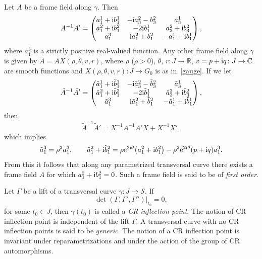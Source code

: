 \documentclass[pdftex]{sigma}
\numberwithin{equation}{section}
\def\S{\mathcal{S}}
\def\S{\mathcal{S}}
\begin{document}
Let $A$ be a frame field along $\gamma$. Then
\[
A^{-1}A'=
\begin{pmatrix}
a_1^1 +{\rm i} b_1^1 & -{\rm i} a_3^2 - b_3^2 & a_3^1\\
a_1^2 +{\rm i} b_1^2 &-2{\rm i} b_1^1 & a_3^2 +{\rm i}b_3^2 \\
 a_1^3 &{\rm i} a_1^2 + b_1^2& -a_1^1 +{\rm i} b_1^1
 \end{pmatrix},
\]
where $a_1^3$ is a strictly positive real-valued function. Any other frame field along $\gamma$
is given by $\tilde A = AX(\rho,\theta,v,r)$, where
$\rho$ ($\rho>0$), $\theta$, $r \colon J \to \mathbb R$, $v=p+{\rm i}q \colon J\to \mathbb C$ are smooth functions
and $X(\rho,\theta,v,r)\colon J \to {G}_0$ is as in~\eqref{gauge}.
%
If we let
\[
\tilde A^{-1}\tilde A'=
\begin{pmatrix}
\tilde a_1^1 +{\rm i} \tilde b_1^1 & -{\rm i} \tilde a_3^2 - \tilde b_3^2 & \tilde a_3^1\\
\tilde a_1^2 +{\rm i} \tilde b_1^2 &-2{\rm i} \tilde b_1^1 & \tilde a_3^2 +{\rm i} \tilde b_3^2 \\
\tilde a_1^3 &{\rm i} \tilde a_1^2 + \tilde b_1^2& -\tilde a_1^1 +{\rm i} \tilde b_1^1
\end{pmatrix},
\]
then
\begin{equation*}%
\tilde A^{-1}\tilde A'= X^{ -1}A^{-1} A'X + X^{ -1}X',
\end{equation*}
which implies
\[
 \tilde a_1^3= \rho^2 a_1^3,\qquad
 \tilde a_1^2 +{\rm i} \tilde b_1^2 = \rho {\rm e}^{3{\rm i}\theta} \big(a_1^2 +{\rm i} b_1^2 \big) - \rho^2 {\rm e}^{2{\rm i}\theta} (p+{\rm i}q) a_1^3.
 \]
%
From this it follows
that along any parametrized transversal curve there exists
a frame field $A$ for which $a_1^2 +{\rm i} b_1^2=0$.
Such a frame field
is said to be of \textit{first order}.
%
\begin{Definition}
Let $\Gamma$ be a lift of a transversal curve $\gamma\colon J \to \S$.
If
\[
 \det(\Gamma,\Gamma',\Gamma'')|_{t_0} = 0,
\]
for some $t_0\in J$, then $\gamma({t_0})$ is called a \emph{CR inflection point}.
The notion of CR inflection point is independent of the lift $\Gamma$.
A transversal curve with no CR inflection points is said to be \emph{generic}.
The notion of a CR inflection point is invariant under reparametrizations and
under the action of the group of CR automorphisms.
\end{Definition}
\end{document}
